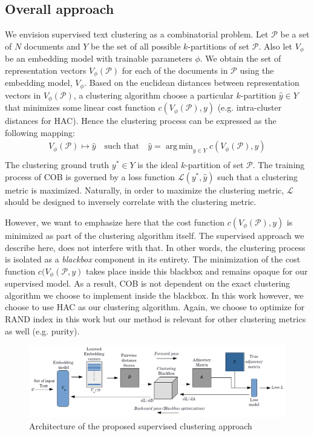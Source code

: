 \documentclass[11pt,a4paper]{article}
\DeclareMathOperator*{\argmin}{arg\,min}
\begin{document}
\subsection{Overall approach}\label{sec:app} We envision supervised text clustering as a combinatorial problem. Let $\mathcal{P}$ be a set of $N$ documents and $Y$ be the set of all possible $k$-partitions of set $\mathcal{P}$. Also let $V_\phi$ be an embedding model with trainable parameters $\phi$. We obtain the set of representation vectors $V_\phi(\mathcal{P})$ for each of the documents in $\mathcal{P}$ using the embedding model, $V_\phi$. Based on the euclidean distances between representation vectors in $V_\phi(\mathcal{P})$, a clustering algorithm choose a particular $k$-partition $\hat{y} \in Y$ that minimizes some linear cost function $c(V_\phi(\mathcal{P}), y)$ (e.g. intra-cluster distances for HAC). Hence the clustering process can be expressed as the following mapping:
\begin{align*}
V_\phi(\mathcal{P}) \mapsto \hat{y} \quad \textrm{such that} \quad \hat{y} = \argmin_{y \in Y} c(V_\phi(\mathcal{P}), y) \\ 
\end{align*}
The clustering ground truth $y^* \in Y$ is the ideal $k$-partition of set $\mathcal{P}$. The training process of COB is governed by a loss function $\mathcal{L}(y^*,\hat{y})$ such that a clustering metric is maximized. Naturally, in order to maximize the clustering metric, $\mathcal{L}$ should be designed to inversely correlate with the clustering metric.

However, we want to emphasize here that the cost function $c(V_\phi(\mathcal{P}), y)$ is minimized as part of the clustering algorithm itself. The supervised approach we describe here, does not interfere with that. In other words, the clustering process is isolated as a \textit{blackbox} component in its entirety. The minimization of the cost function $c(V_\phi(\mathcal{P}, y)$ takes place inside this blackbox and remains opaque for our supervised model. As a result, COB is not dependent on the exact clustering algorithm we choose to implement inside the blackbox. In this work however, we choose to use HAC as our clustering algorithm. Again, we choose to optimize for RAND index in this work but our method is relevant for other clustering metrics as well (e.g. purity).

\begin{figure}
    \centering
    \includegraphics[scale=0.58]{acl-ijcnlp2021-templates/bbcluster_arch.png}
    \caption{Architecture of the proposed supervised clustering approach}
    \label{fig:bbc_arch}
\end{figure}
\end{document}

